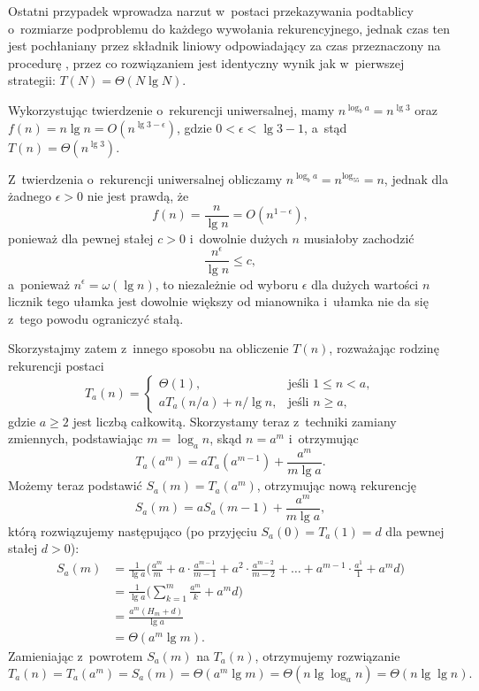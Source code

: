Ostatni przypadek wprowadza narzut w~postaci przekazywania podtablicy o~rozmiarze podproblemu do każdego wywołania rekurencyjnego, jednak czas ten jest pochłaniany przez składnik liniowy odpowiadający za czas przeznaczony na procedurę , przez co rozwiązaniem jest identyczny wynik jak w~pierwszej strategii: $T(N)=\Theta(N\lg N)$.


\subproblem %
Wykorzystując twierdzenie o~rekurencji uniwersalnej, mamy $n^{\log_ba}=n^{\lg3}$ oraz $f(n)=n\lg n=O(n^{\lg3-\epsilon})$, gdzie $0<\epsilon<\lg3-1$, a~stąd $T(n)=\Theta(n^{\lg3})$.

\subproblem %
Z~twierdzenia o~rekurencji uniwersalnej obliczamy $n^{\log_ba}=n^{\log_55}=n$, jednak dla żadnego $\epsilon>0$ nie jest prawdą, że
\[
	f(n) = \frac{n}{\lg n} = O(n^{1-\epsilon}),
\]
ponieważ dla pewnej stałej $c>0$ i~dowolnie dużych $n$ musiałoby zachodzić
\[
	\frac{n^\epsilon}{\lg n} \le c,
\]
a~ponieważ $n^\epsilon=\omega(\lg n)$, to niezależnie od wyboru $\epsilon$ dla dużych wartości $n$ licznik tego ułamka jest dowolnie większy od mianownika i~ułamka nie da się z~tego powodu ograniczyć stałą.

Skorzystajmy zatem z~innego sposobu na obliczenie $T(n)$, rozważając rodzinę rekurencji postaci
\[
	T_a(n) = \begin{cases}
		\Theta(1), & \text{jeśli $1\le n<a$}, \\
		aT_a(n/a)+n/\!\lg n, & \text{jeśli $n\ge a$},
	\end{cases}
\]
gdzie $a\ge2$ jest liczbą całkowitą. Skorzystamy teraz z~techniki zamiany zmiennych, podstawiając $m=\log_an$, skąd $n=a^m$ i~otrzymując
\[
	T_a(a^m) = aT_a(a^{m-1})+\frac{a^m}{m\lg a}.
\]
Możemy teraz podstawić $S_a(m)=T_a(a^m)$, otrzymując nową rekurencję
\[
	S_a(m) = aS_a(m-1)+\frac{a^m}{m\lg a},
\]
którą rozwiązujemy następująco (po przyjęciu $S_a(0)=T_a(1)=d$ dla pewnej stałej $d>0$):
\begin{align*}
	S_a(m) &= \frac{1}{\lg a}\biggl(\frac{a^m}{m}+a\cdot\frac{a^{m-1}}{m-1}+a^2\cdot\frac{a^{m-2}}{m-2}+\dots+a^{m-1}\cdot\frac{a^1}{1}+a^md\biggr) \\[1mm]
	&= \frac{1}{\lg a}\biggl(\sum_{k=1}^m\frac{a^m}{k}+a^md\biggr) \\[1mm]
	&= \frac{a^m(H_m+d)}{\lg a} \\[1mm]
	&= \Theta(a^m\lg m).
\end{align*}
Zamieniając z~powrotem $S_a(m)$ na $T_a(n)$, otrzymujemy rozwiązanie
\[
	T_a(n) = T_a(a^m) = S_a(m) = \Theta(a^m\lg m) = \Theta(n\lg\log_a n) = \Theta(n\lg\lg n).
\]

